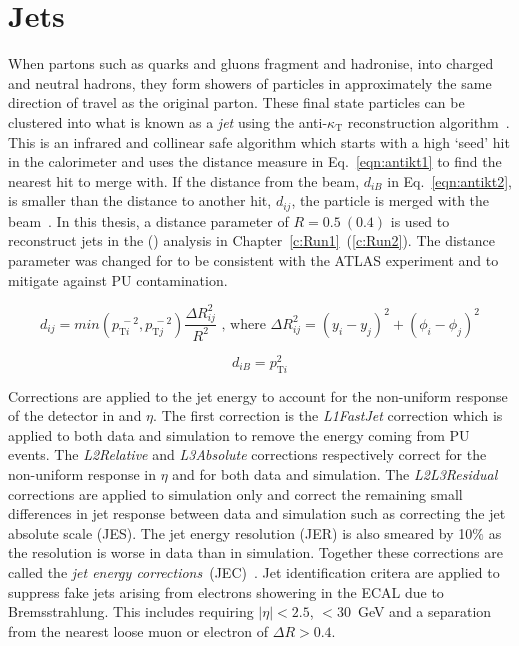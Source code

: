 \section{Jets \label{sec:jetreco}}
When partons such as quarks and gluons fragment and hadronise, into charged and neutral hadrons, they form showers of particles in approximately the same direction of travel as the original parton. These final state particles can be clustered into what is known as a \emph{jet} using the anti-$\kappa_{\textrm{T}}$ reconstruction algorithm~\cite{Cacciari:2008gp}. This is an infrared and collinear safe algorithm which starts with a high \pt `seed' hit in the calorimeter and uses the distance measure in Eq.~\ref{eqn:antikt1} to find the nearest hit to merge with. If the distance from the beam, $d_{iB}$ in Eq.~\ref{eqn:antikt2}, is smaller than the distance to another hit, $d_{ij}$, the particle is merged with the beam~\cite{Salam2010}. In this thesis, a distance parameter of $R = 0.5~\left(0.4\right)$ is used to reconstruct jets in the \runone (\runtwo) analysis in Chapter~\ref{c:Run1}~(\ref{c:Run2}). The distance parameter was changed for \runtwo to be consistent with the ATLAS experiment and to mitigate against PU contamination. 


\begin{equation}
d_{ij}=min\left( p_{\textrm{T}i}^{~-2},p_{\textrm{T}j}^{~-2} \right) \frac{\Delta R_{ij}^{2}}{R^{2}} \textrm{ , where } \Delta R_{ij}^{2} = {\left( y_{i} - y_{j}\right)}^{2} +  {\left( {\phi}_{i} - {\phi}_{j}\right)}^{2}
\label{eqn:antikt1}
\end{equation}

\begin{equation}
d_{iB}=p_{\textrm{T}i}^{2}
\label{eqn:antikt2}
\end{equation}

Corrections are applied to the jet energy to account for the non-uniform response of the detector in \pt and $\eta$. The first correction is the \emph{L1FastJet} correction which is applied to both data and simulation to remove the energy coming from PU events. The \emph{L2Relative} and \emph{L3Absolute} corrections respectively correct for the non-uniform response in $\eta$ and \pt for both data and simulation. The \emph{L2L3Residual} corrections are applied to simulation only and correct the remaining small differences in jet response between data and simulation such as correcting the jet absolute scale (JES). The jet energy resolution (JER) is also smeared by 10$\%$ as the resolution is worse in data than in simulation. Together these corrections are called the \emph{jet energy corrections}~(JEC)~\cite{Khachatryan:2016kdb}.
Jet identification critera are applied to suppress fake jets arising from electrons showering in the ECAL due to Bremsstrahlung. This includes requiring $|\eta|<2.5$, \pt$<30$~GeV and a separation from the nearest loose muon or electron of $\Delta R>0.4$.

